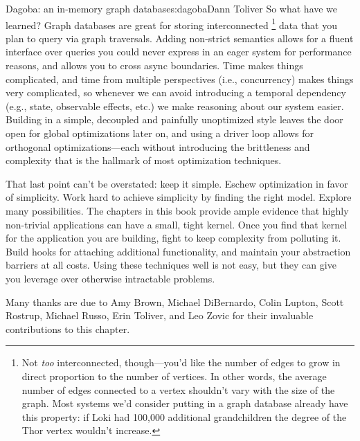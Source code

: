 \begin{aosachapter}{Dagoba: an in-memory graph database}{s:dagoba}{Dann Toliver}
So what have we learned? Graph databases are great for storing
interconnected \footnote{Not \emph{too} interconnected, though---you'd
  like the number of edges to grow in direct proportion to the number of
  vertices. In other words, the average number of edges connected to a
  vertex shouldn't vary with the size of the graph. Most systems we'd
  consider putting in a graph database already have this property: if
  Loki had 100,000 additional grandchildren the degree of the Thor
  vertex wouldn't increase.} data that you plan to query via graph
traversals. Adding non-strict semantics allows for a fluent interface
over queries you could never express in an eager system for performance
reasons, and allows you to cross async boundaries. Time makes things
complicated, and time from multiple perspectives (i.e., concurrency)
makes things very complicated, so whenever we can avoid introducing a
temporal dependency (e.g., state, observable effects, etc.) we make
reasoning about our system easier. Building in a simple, decoupled and
painfully unoptimized style leaves the door open for global
optimizations later on, and using a driver loop allows for orthogonal
optimizations---each without introducing the brittleness and complexity
that is the hallmark of most optimization techniques.

That last point can't be overstated: keep it simple. Eschew optimization
in favor of simplicity. Work hard to achieve simplicity by finding the
right model. Explore many possibilities. The chapters in this book
provide ample evidence that highly non-trivial applications can have a
small, tight kernel. Once you find that kernel for the application you
are building, fight to keep complexity from polluting it. Build hooks
for attaching additional functionality, and maintain your abstraction
barriers at all costs. Using these techniques well is not easy, but they
can give you leverage over otherwise intractable problems.

\label{acknowledgements}

Many thanks are due to Amy Brown, Michael DiBernardo, Colin Lupton,
Scott Rostrup, Michael Russo, Erin Toliver, and Leo Zovic for their
invaluable contributions to this chapter.

\end{aosachapter}
